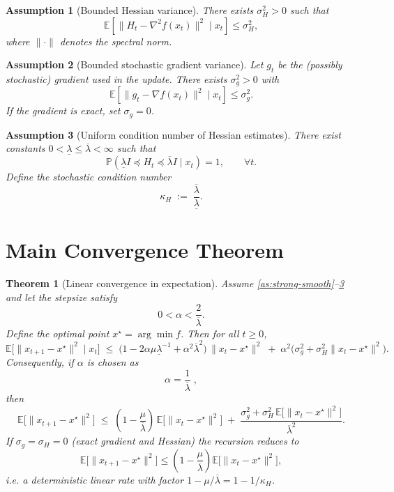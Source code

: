 \documentclass[11pt]{article}
\newtheorem{theorem}{Theorem}[section]
\newtheorem{assumption}{Assumption}[section]
\begin{document}
\begin{assumption}[Bounded Hessian variance]\label{as:hessian-var}
There exists $\sigma_{H}^{2}>0$ such that
\[
\mathbb{E}\!\left[\|H_{t}-\nabla^{2}f(x_{t})\|^{2}\mid x_{t}\right]\le\sigma_{H}^{2},
\]
where $\|\cdot\|$ denotes the spectral norm.
\end{assumption}

\begin{assumption}[Bounded stochastic gradient variance]\label{as:grad-var}
Let $g_{t}$ be the (possibly stochastic) gradient used in the update.
There exists $\sigma_{g}^{2}>0$ with
\[
\mathbb{E}\!\left[\|g_{t}-\nabla f(x_{t})\|^{2}\mid x_{t}\right]\le\sigma_{g}^{2}.
\]
If the gradient is exact, set $\sigma_{g}=0$.
\end{assumption}

\begin{assumption}[Uniform condition number of Hessian estimates]\label{as:cond}
There exist constants $0<\underline{\lambda}\le\overline{\lambda}<\infty$ such that
\[
\mathbb{P}\!\left(\underline{\lambda} I\preceq H_{t}\preceq\overline{\lambda} I\mid x_{t}\right)=1,
\qquad\forall t.
\]
Define the stochastic condition number
\[
\kappa_{H}\;:=\;\frac{\overline{\lambda}}{\underline{\lambda}}.
\]
\end{assumption}

\section{Main Convergence Theorem}
\begin{theorem}[Linear convergence in expectation]\label{thm:linear}
Assume \ref{as:strong-smooth}–\ref{as:cond} and let the stepsize satisfy
\[
0<\alpha<\frac{2}{\overline{\lambda}} .
\]
Define the optimal point $x^{\star}= \arg\min f$. Then for all $t\ge0$,
\begin{equation}\label{eq:recursion}
\mathbb{E}\!\bigl[\|x_{t+1}-x^{\star}\|^{2}\mid x_{t}\bigr]
\;\le\;
\bigl(1-2\alpha\mu\underline{\lambda}^{-1}+ \alpha^{2}\overline{\lambda}^{2}\bigr)\,
\|x_{t}-x^{\star}\|^{2}
\;+\;
\alpha^{2}\bigl(\sigma_{g}^{2}+\sigma_{H}^{2}\|x_{t}-x^{\star}\|^{2}\bigr).
\end{equation}
Consequently, if $\alpha$ is chosen as
\[
\alpha=\frac{1}{\overline{\lambda}}\;,
\]
then
\[
\mathbb{E}\!\bigl[\|x_{t+1}-x^{\star}\|^{2}\bigr]
\;\le\;
\left(1-\frac{\mu}{\overline{\lambda}}\right)\,
\mathbb{E}\!\bigl[\|x_{t}-x^{\star}\|^{2}\bigr]
\;+\;
\frac{\sigma_{g}^{2}+\sigma_{H}^{2}\,\mathbb{E}\!\bigl[\|x_{t}-x^{\star}\|^{2}\bigr]}{\overline{\lambda}^{2}} .
\]
If $\sigma_{g}=\sigma_{H}=0$ (exact gradient and Hessian) the recursion reduces to
\[
\mathbb{E}\!\bigl[\|x_{t+1}-x^{\star}\|^{2}\bigr]
\le\left(1-\frac{\mu}{\overline{\lambda}}\right)
\mathbb{E}\!\bigl[\|x_{t}-x^{\star}\|^{2}\bigr],
\]
i.e. a deterministic linear rate with factor $1-\mu/\overline{\lambda}=1-1/\kappa_{H}$.
\end{theorem}
\end{document}
